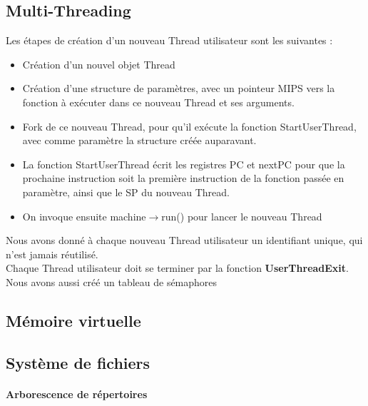 \documentclass{report}
\newcommand{\myparagraph}[1]{\paragraph*{#1}\mbox{}\\}
\begin{document}
\subsection*{Multi-Threading}
\noindent
Les étapes de création d'un nouveau Thread utilisateur sont les suivantes : 
\begin{itemize}
	\item Création d'un nouvel objet Thread
	\item Création d'une structure de paramètres, avec un pointeur MIPS vers la fonction à exécuter dans ce nouveau Thread et ses arguments.
	\item Fork de ce nouveau Thread, pour qu'il exécute la fonction StartUserThread, avec comme paramètre la structure créée auparavant.
	\item La fonction StartUserThread écrit les registres PC et nextPC pour que la prochaine instruction soit la première instruction de la fonction passée en paramètre, ainsi que le SP du nouveau Thread.
	\item On invoque ensuite machine$\rightarrow$run() pour lancer le nouveau Thread
\end{itemize}
Nous avons donné à chaque nouveau Thread utilisateur un identifiant unique, qui n'est jamais réutilisé.\\
Chaque Thread utilisateur doit se terminer par la fonction \textbf{UserThreadExit}.
Nous avons aussi créé un tableau de sémaphores 
\subsection*{Mémoire virtuelle}

\subsection*{Système de fichiers}
\myparagraph{Arborescence de répertoires}\\
	
\end{document}
